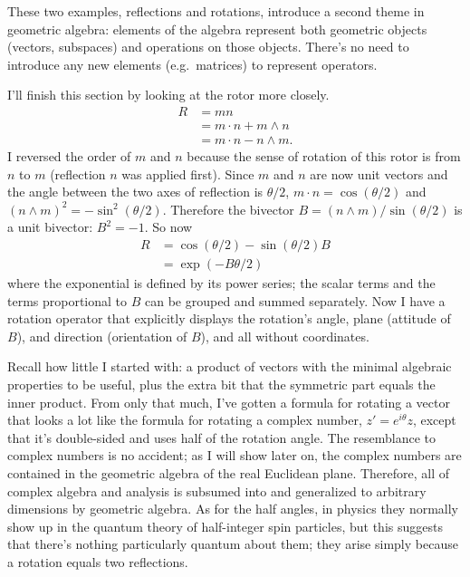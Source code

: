 \documentclass{utarticle}
\DeclareMathOperator{\inp}{\cdot}
\DeclareMathOperator{\out}{\wedge}
\begin{document}
These two examples, reflections and rotations, introduce a second theme in 
geometric algebra: elements of the algebra represent both geometric objects 
(vectors, subspaces) and operations on those objects.  There's no need to introduce 
any new elements (e.g.\ matrices) to represent operators.

I'll finish this section by looking at the rotor more closely.
\begin{align}
R & = m n \nonumber \\
  & = m \inp n + m \out n \nonumber \\
  & = m \inp n - n \out m.
\end{align}
I reversed the order of $m$ and $n$ because the sense of rotation of this 
rotor is from $n$ to $m$ (reflection $n$ was applied first).  Since $m$ 
and $n$ are now unit vectors and the angle between the two axes of 
reflection is $\theta/2$, $m \inp n = \cos(\theta/2)$ and 
$(n \out m)^2 = -\sin^2(\theta/2)$.  Therefore the bivector $B = 
(n \out m)/\sin(\theta/2)$ is a unit bivector: $B^2 = -1$.  So now
\begin{align}
R  & = \cos(\theta/2) - \sin(\theta/2) B \nonumber \\
     & = \exp(-B\theta/2) 
\end{align}
where the exponential is defined by its power series; the scalar terms and 
the terms proportional to $B$ can be grouped and summed separately.  
Now I have a rotation operator that explicitly displays the rotation's angle, 
plane (attitude of $B$), and direction (orientation of $B$), and all without 
coordinates.  

Recall how little I started with: a product of vectors with the minimal 
algebraic properties to be useful, plus the extra bit that the symmetric part equals
the inner product.  From only that much, I've gotten a formula for rotating
a vector that looks a lot like the formula for rotating a complex number, 
$z' = e^{i\theta} z$, except that it's double-sided and uses half of the rotation 
angle.  The resemblance to complex numbers is no accident; as I will show later 
on, the complex numbers are contained in the geometric algebra of the real 
Euclidean plane.  Therefore, all of complex algebra and analysis is 
subsumed into and generalized to arbitrary dimensions by geometric algebra.  
As for the half angles, in physics they normally show up in the quantum 
theory of half-integer spin particles, but this suggests that there's nothing 
particularly quantum about them; they arise simply because a rotation 
equals two reflections.
\end{document}
